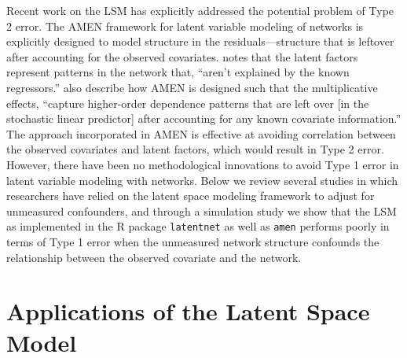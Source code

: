 \documentclass[11pt]{article}
\begin{document}
Recent work on the LSM has explicitly addressed the potential problem of Type 2 error. The AMEN framework for latent variable modeling of networks is explicitly designed to model structure in the residuals---structure that is leftover after accounting for the observed covariates. \citet[p. 43]{hoff2015dyadic} notes that the latent factors represent patterns in the network that, ``aren't explained by the known regressors.'' \citet[pp. 12--13]{minhas2016inferential} also describe how AMEN is designed such that the multiplicative effects, ``capture higher-order dependence patterns that are left over [in the stochastic linear predictor] after accounting for any known covariate information.''  The approach incorporated in AMEN is effective at avoiding correlation between the observed covariates and latent factors, which would result in Type 2 error. However, there have been no methodological innovations to avoid Type 1 error in latent variable modeling with networks. Below we review several studies in which researchers have relied on the latent space modeling framework to adjust for unmeasured confounders, and through a simulation study we show that the LSM as implemented in the R package \texttt{latentnet} as well as \texttt{amen} performs poorly in terms of Type 1 error when the unmeasured network structure confounds the relationship between the observed covariate and the network.


\section{Applications of the Latent Space Model}
\end{document}

